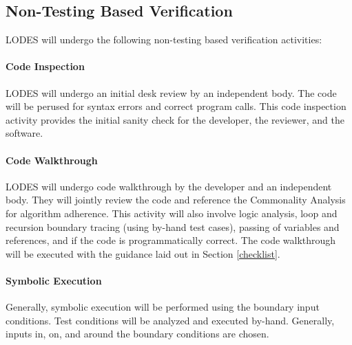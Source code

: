 \documentclass[12pt, titlepage]{article}
\newcommand{\famname}{LODES} %
\begin{document}

		

\subsection{Non-Testing Based Verification}
\famname{} will undergo the following non-testing based verification activities:

\paragraph{Code Inspection\\}
\famname{} will undergo an initial desk review by an independent body.  The code
will be perused for syntax errors and correct program calls.  This code
inspection activity provides the initial sanity check for the developer, the
reviewer, and the software.  

\paragraph{Code Walkthrough\\}
\famname{} will undergo code walkthrough by the developer and an independent
body.  They will jointly review the code and reference the Commonality Analysis
for algorithm adherence. This activity will also involve logic analysis, loop
and recursion boundary tracing (using by-hand test cases), passing of variables
and references, and if the code is programmatically correct. The code
walkthrough will be executed with the guidance laid out in Section
\ref{checklist}.  

\paragraph{Symbolic Execution\\}
Generally, symbolic execution will be performed using the boundary input conditions. Test conditions will be
analyzed and executed by-hand. Generally, inputs in, on, and around the boundary
conditions are chosen.  
\end{document}
